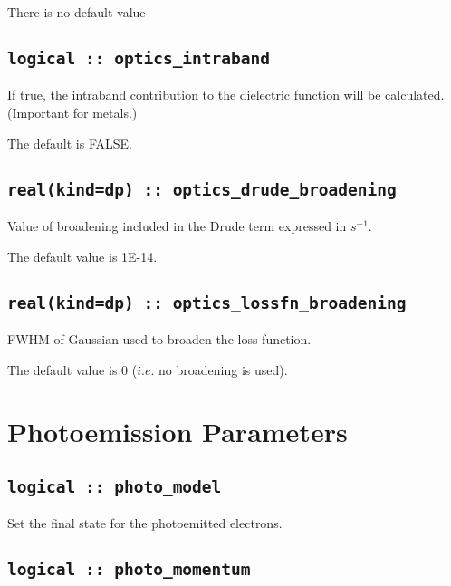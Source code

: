 \documentclass[a4paper,11pt,twoside]{book}
\begin{document}
There is no default value

\subsection[optics\_intraband]{\tt logical :: optics\_intraband}
If true, the intraband contribution to the dielectric function will be calculated.  (Important for metals.)

The default is FALSE.

\subsection[optics\_drude\_broadening]{\tt real(kind=dp) :: optics\_drude\_broadening}
Value of broadening included in the Drude term expressed in $s^{-1}$.

The default value is 1E-14.

\subsection[optics\_lossfn\_broadening]{\tt real(kind=dp) :: optics\_lossfn\_broadening}
FWHM of Gaussian used to broaden the loss function.

The default value is 0 ($i.e.$ no broadening is used).

\section{Photoemission Parameters}

\subsection[photo\_model]{\tt logical :: photo\_model}

Set the final state for the photoemitted electrons.


\subsection[photo\_momentum]{\tt logical :: photo\_momentum}
\end{document}
